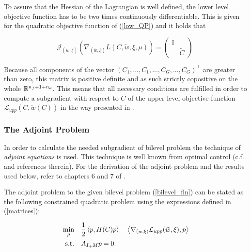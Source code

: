 To assure that the Hessian of the Lagrangian is well defined, the lower level objective function has to be two times continuously differentiable. This is given for the quadratic objective function of (\ref{low_QP}) and it holds that 

\[\mathcal{J}_{(\tilde{w},\xi)}\left(\nabla_{(\tilde{w},\xi)}L(C,\tilde{w},\xi,\mu)\right) = \begin{pmatrix} \mathbb{I} \\ & \tilde{C}\end{pmatrix}. \] 

Because all components of the vector \((C_1,...,C_1,...,C_G,...,C_G)^{\top}\) are greater than zero, this matrix is positive definite and as such strictly copositive on the whole \(\mathbb{R}^{n_f+1+n_d}\).
This means that all necessary conditions are fulfilled in order to compute a subgradient with respect to \(C\) of the upper level objective function \(\mathcal{L}_{upp}(C,\tilde{w}(C))\) in the way presented in \cite{Outrata1998}.

\subsubsection{The Adjoint Problem}

In order to calculate the needed subgradient of bilevel problem the technique of \emph{adjoint equations} is used. This technique is well known from optimal control (c.f. \cite[p. 126]{Outrata1998} and references therein). For the derivation of the adjoint problem and the results used below, refer to chapters 6 and 7 of \cite{Outrata1998}. 

The adjoint problem to the given bilevel problem (\ref{bilevel_fin}) can be stated as the following constrained quadratic problem using the expressions defined in (\ref{matrices}):

\begin{equation}
\begin{split}
	\min_{p} & \quad\frac{1}{2}\left\langle p,H(C)p\right\rangle - \left\langle \nabla_{(\tilde{w},\xi)} \mathcal{L}_{upp}(\tilde{w},\xi),p\right\rangle \\
	\text{s.t.} & \quad A_{I_+M}p = 0.
\end{split}
\label{adj_prob}
\end{equation}

